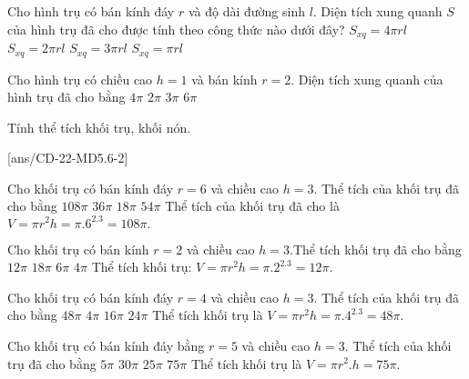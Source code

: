 \begin{ex}%
	Cho hình trụ có bán kính đáy $r$ và độ dài đường sinh $l$. Diện tích xung quanh $S$ của hình trụ đã cho được tính theo công thức nào dưới đây?
	\choice
	{$S_{x q}=4 \pi r l$}
	{\True $S_{x q}=2 \pi r l$}
	{$S_{x q}=3 \pi r l$}
	{$S_{x q}=\pi r l$}
\end{ex}
\begin{ex}%
	Cho hình trụ có chiều cao $ h=1$ và bán kính $ r=2$. Diện tích xung quanh của hình trụ đã cho bằng
	\choice
	{\True $4 \pi$}
	{$2 \pi$}
	{$3 \pi$}
	{$6 \pi$}
\end{ex}


\begin{dang}{Tính thể tích khối trụ, khối nón.}
\end{dang}
[ans/CD-22-MD5.6-2]
\begin{ex}%
	Cho khối trụ có bán kính đáy $r=6$ và chiều cao $h=3$. Thể tích của khối trụ đã cho bằng
	\choice 
	{\True$108 \pi$}
	{$36 \pi$}
	{ $18 \pi$}
	{ $54 \pi$}
	\loigiai
	{Thể tích của khối trụ đã cho là $V=\pi r^2 h=\pi.6^2.3=108 \pi.$}
\end{ex}
\begin{ex} %
	Cho khối trụ có bán kính $r=2$ và chiều cao $h=3$.Thể tích khối trụ đã cho bằng
	\choice
	{\True$12 \pi$}
	{ $18 \pi$}
	{ $6 \pi$}
	{ $4 \pi$}
	\loigiai
	{Thể tích khối trụ: $V=\pi r^2 h=\pi.2^2.3=12 \pi.$}
\end{ex}

\begin{ex} %
	Cho khối trụ có bán kính đáy $r=4$ và chiều cao $h=3$. Thể tích của khối trụ đã cho bằng
	\choice 
	{ \True$48 \pi$}
	{ $4 \pi$}
	{ $16 \pi$}
	{ $24 \pi$}
	\loigiai
	{Thể tích khối trụ là $V=\pi r^2 h=\pi. 4^2.3=48 \pi.$}
\end{ex}

\begin{ex} %
	Cho khối trụ có bán kính đáy bằng $r=5$ và chiều cao $h=3$. Thể tích của khối trụ đã cho bằng
	\choice 
	{ $5 \pi$}
	{ $30 \pi$}
	{ $25 \pi$}
	{ \True$75 \pi$}
	\loigiai
	{Thể tích khối trụ là $V=\pi r^2.h=75 \pi.$}
\end{ex}

